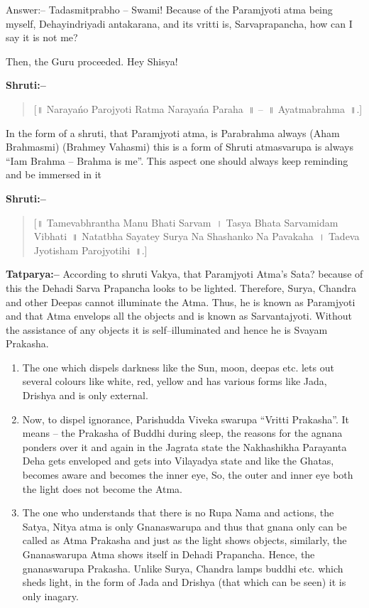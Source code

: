 Answer:– Tadasmitprabho – Swami! Because of the Paramjyoti atma being myself, Dehayindriyadi antakarana, and its vritti is, Sarvaprapancha, how can I say it is not me?

Then, the Guru proceeded. Hey Shisya!

\textbf{Shruti:–}

\begin{verse}
[॥ Narayańo Parojyoti Ratma Narayańa Paraha~॥ –~॥ Ayatmabrahma~॥.]
\end{verse}

In the form of a shruti, that Paramjyoti atma, is Parabrahma always (Aham Brahmasmi) (Brahmey Vahasmi) this is a form of Shruti atmasvarupa is always “Iam Brahma – Brahma is me”. This aspect one should always keep reminding and be immersed in it 

\textbf{Shruti:–}

\begin{verse}
[॥ Tamevabhrantha Manu Bhati Sarvam~। Tasya Bhata Sarvamidam Vibhati~॥ Natatbha Sayatey Surya Na Shashanko Na Pavakaha~। Tadeva Jyotisham Parojyotihi~॥.]
\end{verse}

\textbf{Tatparya:–} According to shruti Vakya, that Paramjyoti Atma's Sata? because of this the Dehadi Sarva Prapancha looks to be lighted. Therefore, Surya, Chandra and other Deepas cannot illuminate the Atma. Thus, he is known as Paramjyoti and that Atma envelops all the objects and is known as Sarvantajyoti. Without the assistance of any objects it is self–illuminated and hence he is Svayam Prakasha.

\begin{enumerate}
\item The one which dispels darkness like the Sun, moon, deepas etc. lets out several colours like white, red, yellow and has various forms like Jada, Drishya and is only external.

 \item Now, to dispel ignorance, Parishudda Viveka swarupa “Vritti Prakasha”. It means – the Prakasha of Buddhi during sleep, the reasons for the agnana ponders over it and again in the Jagrata state the Nakhashikha Parayanta Deha gets enveloped and gets into Vilayadya state and like the Ghatas, becomes aware and becomes the inner eye, So, the outer and inner eye both the light does not become the Atma.

 \item The one who understands that there is no Rupa Nama and actions, the Satya, Nitya atma is only Gnanaswarupa and thus that gnana only can be called as Atma Prakasha and just as the light shows objects, similarly, the Gnanaswarupa Atma shows itself in Dehadi Prapancha. Hence, the gnanaswarupa Prakasha. Unlike Surya, Chandra lamps buddhi etc. which sheds light, in the form of Jada and Drishya (that which can be seen) it is only inagary.

\end{enumerate}

